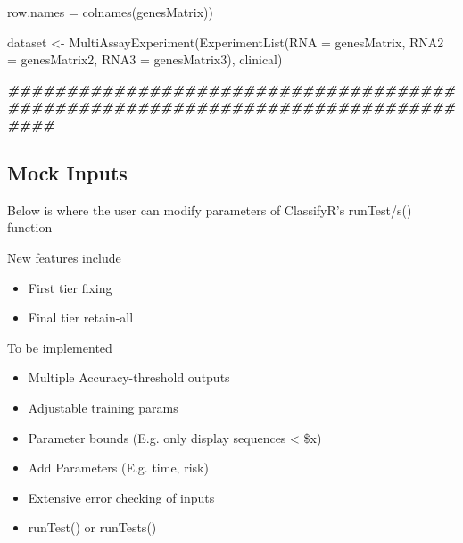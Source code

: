 \documentclass[
]{article}
\newenvironment{Shaded}{\begin{snugshade}}{\end{snugshade}}
\newcommand{\AttributeTok}[1]{\textcolor[rgb]{0.77,0.63,0.00}{#1}}
\newcommand{\DocumentationTok}[1]{\textcolor[rgb]{0.56,0.35,0.01}{\textbf{\textit{#1}}}}
\newcommand{\FunctionTok}[1]{\textcolor[rgb]{0.00,0.00,0.00}{#1}}
\newcommand{\NormalTok}[1]{#1}
\newcommand{\OtherTok}[1]{\textcolor[rgb]{0.56,0.35,0.01}{#1}}
\begin{document}
\begin{Shaded}
\begin{Highlighting}[]
                \AttributeTok{row.names =} \FunctionTok{colnames}\NormalTok{(genesMatrix))}
  
\NormalTok{  dataset }\OtherTok{\textless{}{-}} \FunctionTok{MultiAssayExperiment}\NormalTok{(}\FunctionTok{ExperimentList}\NormalTok{(}\AttributeTok{RNA =}\NormalTok{ genesMatrix, }\AttributeTok{RNA2 =}\NormalTok{ genesMatrix2, }\AttributeTok{RNA3 =}\NormalTok{ genesMatrix3), clinical)}

  
\DocumentationTok{\#\#\#\#\#\#\#\#\#\#\#\#\#\#\#\#\#\#\#\#\#\#\#\#\#\#\#\#\#\#\#\#\#\#\#\#\#\#\#\#\#\#\#\#\#\#\#\#\#\#\#\#\#\#\#\#\#\#\#\#\#\#\#\#\#\#\#\#\#\#\#\#\#\#\#\#\#\#\#\#}
\end{Highlighting}
\end{Shaded}

\hypertarget{mock-inputs}{%
\subsection{Mock Inputs}\label{mock-inputs}}

Below is where the user can modify parameters of ClassifyR's runTest/s()
function

New features include

\begin{itemize}
\item
  First tier fixing
\item
  Final tier retain-all
\end{itemize}

To be implemented

\begin{itemize}
\item
  Multiple Accuracy-threshold outputs
\item
  Adjustable training params
\item
  Parameter bounds (E.g. only display sequences \textless{} \$x)
\item
  Add Parameters (E.g. time, risk)
\item
  Extensive error checking of inputs
\item
  runTest() or runTests()
\end{itemize}
\end{document}
